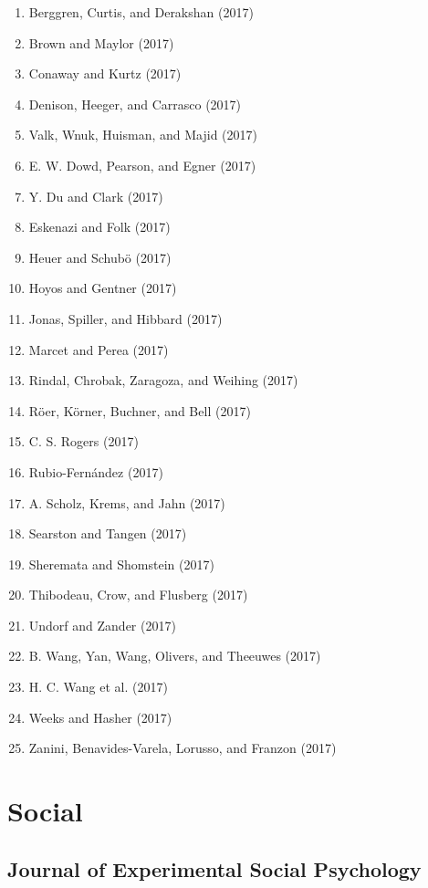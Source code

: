 \documentclass[english,man]{apa6}
\providecommand{\tightlist}{%
  \setlength{\itemsep}{0pt}\setlength{\parskip}{0pt}}
\theoremstyle{definition}
\theoremstyle{definition}
\theoremstyle{definition}
\theoremstyle{remark}
\begin{document}
\begin{enumerate}
\def\labelenumi{\arabic{enumi})}
\tightlist
\item
  Berggren, Curtis, and Derakshan (2017)
\item
  Brown and Maylor (2017)
\item
  Conaway and Kurtz (2017)
\item
  Denison, Heeger, and Carrasco (2017)
\item
  Valk, Wnuk, Huisman, and Majid (2017)
\item
  E. W. Dowd, Pearson, and Egner (2017)
\item
  Y. Du and Clark (2017)
\item
  Eskenazi and Folk (2017)
\item
  Heuer and Schubö (2017)
\item
  Hoyos and Gentner (2017)
\item
  Jonas, Spiller, and Hibbard (2017)
\item
  Marcet and Perea (2017)
\item
  Rindal, Chrobak, Zaragoza, and Weihing (2017)
\item
  Röer, Körner, Buchner, and Bell (2017)
\item
  C. S. Rogers (2017)
\item
  Rubio-Fernández (2017)
\item
  A. Scholz, Krems, and Jahn (2017)
\item
  Searston and Tangen (2017)
\item
  Sheremata and Shomstein (2017)
\item
  Thibodeau, Crow, and Flusberg (2017)
\item
  Undorf and Zander (2017)
\item
  B. Wang, Yan, Wang, Olivers, and Theeuwes (2017)
\item
  H. C. Wang et al. (2017)
\item
  Weeks and Hasher (2017)
\item
  Zanini, Benavides-Varela, Lorusso, and Franzon (2017)
\end{enumerate}

\section{Social}\label{social}

\subsection{Journal of Experimental Social
Psychology}\label{journal-of-experimental-social-psychology}
\end{document}
